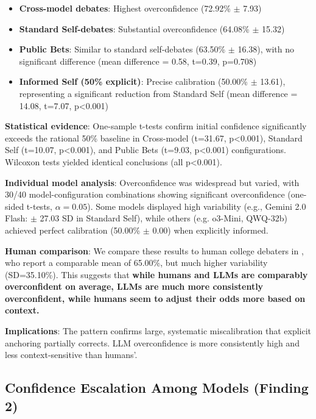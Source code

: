\documentclass{article}
\begin{document}
\begin{itemize}
    \item \textbf{Cross-model debates}: Highest overconfidence (72.92\% $\pm$ 7.93)
    \item \textbf{Standard Self-debates}: Substantial overconfidence (64.08\% $\pm$ 15.32)
    \item \textbf{Public Bets}: Similar to standard self-debates (63.50\% $\pm$ 16.38), with no significant difference (mean difference = 0.58, t=0.39, p=0.708)
    \item \textbf{Informed Self (50\% explicit)}: Precise calibration (50.00\% $\pm$ 13.61), representing a significant reduction from Standard Self (mean difference = 14.08, t=7.07, p<0.001)
\end{itemize}

\textbf{Statistical evidence}: One-sample t-tests confirm initial confidence significantly exceeds the rational 50\% baseline in Cross-model (t=31.67, p<0.001), Standard Self (t=10.07, p<0.001), and Public Bets (t=9.03, p<0.001) configurations. Wilcoxon tests yielded identical conclusions (all p<0.001).

\textbf{Individual model analysis}: Overconfidence was widespread but varied, with 30/40 model-configuration combinations showing significant overconfidence (one-sided t-tests, $\alpha=0.05$). Some models displayed high variability (e.g., Gemini 2.0 Flash: $\pm$ 27.03 SD in Standard Self), while others (e.g. o3-Mini, QWQ-32b) achieved perfect calibration (50.00\% $\pm$ 0.00) when explicitly informed.

\textbf{Human comparison}: We compare these results to human college debaters in \citet{RePEc:sip:dpaper:06-042}, who report a comparable mean of 65.00\%, but much higher variability (SD=35.10\%). This suggests that \textbf{while humans and LLMs are comparably overconfident on average, LLMs are much more consistently overconfident, while humans seem to adjust their odds more based on context.}

\textbf{Implications}: The pattern confirms large, systematic miscalibration that explicit anchoring partially corrects. LLM overconfidence is more consistently high and less context-sensitive than humans'.

\subsection{Confidence Escalation Among Models (Finding 2)}
\label{subsec:confidence_escalation}
\end{document}
